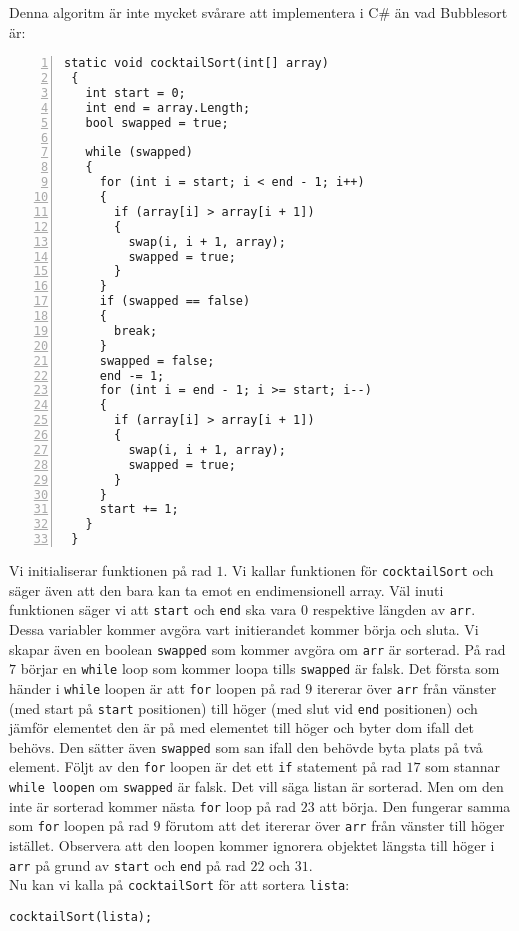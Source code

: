 \documentclass[a4, oneside]{report}
\begin{document}
Denna algoritm är inte mycket svårare att implementera i C\# än vad Bubblesort är:
\begin{lstlisting}[style=mystyle, numbers=left]
 static void cocktailSort(int[] array)
 {
   int start = 0;
   int end = array.Length;
   bool swapped = true;
   
   while (swapped) 
   {
     for (int i = start; i < end - 1; i++)
     {
       if (array[i] > array[i + 1])
       {
         swap(i, i + 1, array);
         swapped = true;
       }
     }
     if (swapped == false)
     {
       break;
     }
     swapped = false;
     end -= 1;
     for (int i = end - 1; i >= start; i--)
     {
       if (array[i] > array[i + 1])
       {
         swap(i, i + 1, array);
         swapped = true;
       }
     }
     start += 1;
   }
 }
\end{lstlisting}
Vi initialiserar funktionen på rad $1$. Vi kallar funktionen för \lstinline{cocktailSort} och säger även att den bara kan ta emot en endimensionell array. Väl inuti funktionen säger vi att \lstinline{start} och \lstinline{end} ska vara $0$ respektive längden av \lstinline{arr}. Dessa variabler kommer avgöra vart initierandet kommer börja och sluta. Vi skapar även en boolean \lstinline{swapped} som kommer avgöra om \lstinline{arr} är sorterad. På rad $7$ börjar en \lstinline{while} loop som kommer loopa tills \lstinline{swapped} är falsk. Det första som händer i \lstinline{while} loopen är att \lstinline{for} loopen på rad $9$ itererar över \lstinline{arr} från vänster (med start på \lstinline{start} positionen) till höger (med slut vid \lstinline{end} positionen) och jämför elementet den är på med elementet till höger och byter dom ifall det behövs. Den sätter även \lstinline{swapped} som san ifall den behövde byta plats på två element. Följt av den \lstinline{for} loopen är det ett \lstinline{if} statement på rad $17$ som stannar \lstinline{while loopen} om \lstinline{swapped} är falsk. Det vill säga listan är sorterad. Men om den inte är sorterad kommer nästa \lstinline{for} loop på rad  $23$ att börja. Den fungerar samma som \lstinline{for} loopen på rad $9$ förutom att det itererar över \lstinline{arr} från vänster till höger istället. Observera att den loopen kommer ignorera objektet längsta till höger i \lstinline{arr} på grund av \lstinline{start} och \lstinline{end} på rad $22$ och $31$.\\
Nu kan vi kalla på \lstinline{cocktailSort} för att sortera \lstinline{lista}:
\begin{lstlisting}[style=mystyle, numbers=none]
 cocktailSort(lista);
\end{lstlisting}
\end{document}
